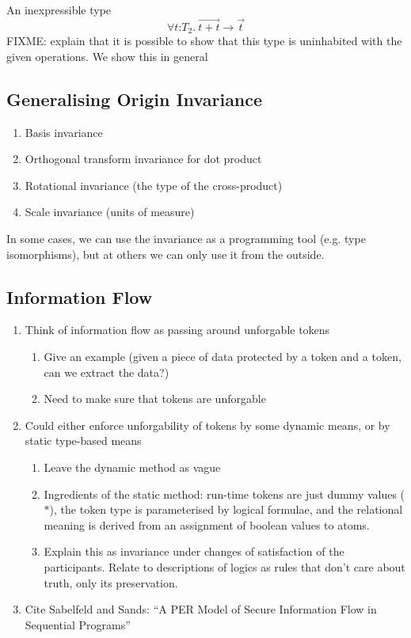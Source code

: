 \begin{example}
  An inexpressible type
  \begin{displaymath}
    \forall t \mathord: T_2.\ \vec{t + t} \to \vec{t}
  \end{displaymath}
  FIXME: explain that it is possible to show that this type is
  uninhabited with the given operations. We show this in general 
\end{example}

\subsection{Generalising Origin Invariance}
\label{sec:motivation-generalising}

\begin{enumerate}
\item Basis invariance
\item Orthogonal transform invariance for dot product
\item Rotational invariance (the type of the cross-product)
\item Scale invariance (units of measure)
\end{enumerate}

In some cases, we can use the invariance as a programming tool
(e.g. type isomorphisms), but at others we can only use it from the
outside.

\subsection{Information Flow}
\label{sec:information-flow}

\begin{enumerate}
\item Think of information flow as passing around unforgable tokens
  \begin{enumerate}
  \item Give an example (given a piece of data protected by a token
    and a token, can we extract the data?)
  \item Need to make sure that tokens are unforgable
  \end{enumerate}
\item Could either enforce unforgability of tokens by some dynamic
  means, or by static type-based means
  \begin{enumerate}
  \item Leave the dynamic method as vague
  \item Ingredients of the static method: run-time tokens are just
    dummy values ($*$), the token type is parameterised by logical
    formulae, and the relational meaning is derived from an assignment
    of boolean values to atoms.
  \item Explain this as invariance under changes of satisfaction of
    the participants. Relate to descriptions of logics as rules that
    don't care about truth, only its preservation.
  \end{enumerate}
\item Cite Sabelfeld and Sands: ``A PER Model of Secure Information
  Flow in Sequential Programs''
\end{enumerate}

